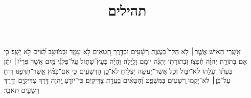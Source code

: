 \documentclass{openreader}
\title{תהילים}
\date{}
\begin{document}
\maketitle
\raggedbottom 
\fontsize{16pt}{24pt}\selectfont


אַ֥שְֽׁרֵי־הָאִ֗ישׁ אֲשֶׁ֤ר׀ לֹ֥א הָלַךְ֮ בַּעֲצַ֢ת רְשָׁ֫עִ֥ים וּבְדֶ֣רֶךְ חַ֭טָּאִים לֹ֥א עָמָ֑ד וּבְמֹושַׁ֥ב לֵ֝צִ֗ים לֹ֣א יָשָֽׁב׃ 
כִּ֤י אִ֥ם בְּתֹורַ֥ת יְהוָ֗ה חֶ֫פְצֹ֥ו וּֽבְתֹורָתֹ֥ו יֶהְגֶּ֗ה יֹומָ֥ם וָלָֽיְלָה׃ 
וְֽהָיָ֗ה כְּעֵץ֮ שָׁת֢וּל עַֽל־פַּלְגֵ֫י מָ֥יִם אֲשֶׁ֤ר פִּרְיֹ֨ו׀ יִתֵּ֬ן בְּעִתֹּ֗ו וְעָלֵ֥הוּ לֹֽא־יִבֹּ֑ול וְכֹ֖ל אֲשֶׁר־יַעֲשֶׂ֣ה יַצְלִֽיחַ׃ 
לֹא־כֵ֥ן הָרְשָׁעִ֑ים כִּ֥י אִם־כַּ֝מֹּ֗ץ אֲֽשֶׁר־תִּדְּפֶ֥נּוּ רֽוּחַ׃ 
עַל־כֵּ֤ן׀ לֹא־יָקֻ֣מוּ רְ֭שָׁעִים בַּמִּשְׁפָּ֑ט וְ֝חַטָּאִ֗ים בַּעֲדַ֥ת צַדִּיקִֽים׃ 
כִּֽי־יֹודֵ֣עַ יְ֭הוָה דֶּ֣רֶךְ צַדִּיקִ֑ים וְדֶ֖רֶךְ רְשָׁעִ֣ים תֹּאבֵֽד׃ 
\end{document}
